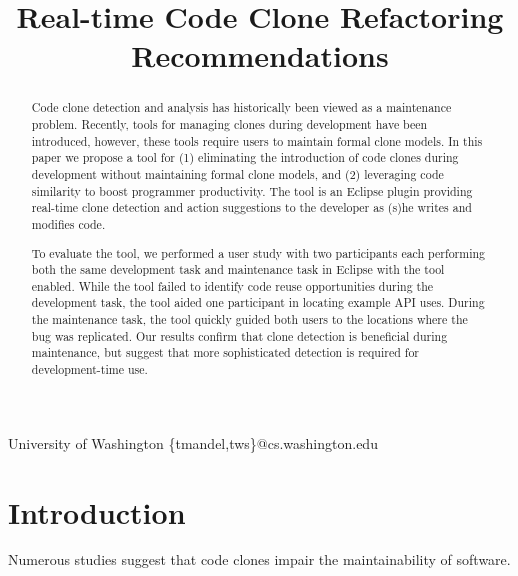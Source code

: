 \documentclass[nocopyrightspace,10pt]{sigplanconf}
\begin{document}
%

\title{Real-time Code Clone Refactoring Recommendations}
           {University of Washington}
           {\{tmandel,tws\}@cs.washington.edu}

\maketitle
\begin{abstract}
Code clone detection and analysis has historically been viewed as a
maintenance problem. Recently, tools for managing clones during
development have been introduced, however, these tools require
users to maintain formal clone models.
In this paper we propose a tool for (1) eliminating the
introduction of code clones during development without maintaining formal clone models, and (2) leveraging code
similarity to boost programmer productivity.
The tool
is an Eclipse plugin providing real-time clone detection and action
suggestions to the developer as (s)he writes and modifies
code. 

To evaluate the tool, we performed a user study with two participants
each performing both the same development task and maintenance task in Eclipse
with the tool enabled.  While the tool failed to identify code reuse
opportunities during the development task, the tool aided one
participant in locating example API uses. During the maintenance
task, the tool quickly guided both users to the locations where the
bug was replicated. Our results confirm that clone detection is
beneficial during maintenance, but suggest that more sophisticated
detection is required for development-time use.

\end{abstract}



\section{Introduction}
\label{sec:intro}
Numerous studies suggest that code clones impair the maintainability
of software.
\end{document}
